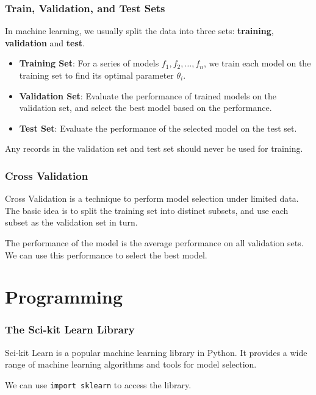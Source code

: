 \documentclass[beamer, en, version=2.0]{huangfusl-template}
\begin{document}
    \begin{frame}
        \frametitle{Train, Validation, and Test Sets}

        In machine learning, we usually split the data into three sets: \textbf{training}, \textbf{validation} and \textbf{test}.

        \begin{itemize}
            \item \textbf{Training Set}: For a series of models $f_1, f_2, \ldots, f_n$, we train each model on the training set to find its optimal parameter $\theta_i$.
            \item \textbf{Validation Set}: Evaluate the performance of trained models on the validation set, and select the best model based on the performance.
            \item \textbf{Test Set}: Evaluate the performance of the selected model on the test set.
        \end{itemize}

        Any records in the validation set and test set should never be used for training.
    \end{frame}

    \begin{frame}
        \frametitle{Cross Validation}

        Cross Validation is a technique to perform model selection under limited data. The basic idea is to split the training set into distinct subsets, and use each subset as the validation set in turn.

        The performance of the model is the average performance on all validation sets. We can use this performance to select the best model.
    \end{frame}

    \section{Programming}

    \begin{frame}[fragile]
        \frametitle{The Sci-kit Learn Library}

        Sci-kit Learn is a popular machine learning library in Python. It provides a wide range of machine learning algorithms and tools for model selection.

        We can use {\footnotesize\color{darkred}\verb|import sklearn|} to access the library.
    \end{frame}
\end{document}
